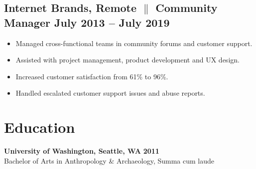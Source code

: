 \documentclass[a4paper,10pt]{article}
\begin{document}
\subsection{Internet Brands, Remote {$\parallel$}{ Community Manager} \hfill
      \textbf{July 2013 – July
            2019}}
\begin{itemize}
      \item Managed cross-functional teams in community forums and customer support.
      \item Assisted with project management, product development and UX design.
      \item Increased customer satisfaction from 61\%
            to
            96\%.
      \item Handled escalated customer support issues and abuse reports.
\end{itemize}

\section{Education}
\textbf{University of Washington, Seattle, WA} \hfill
\textbf{2011}
\\
Bachelor of Arts in Anthropology \& Archaeology, Summa cum laude
\end{document}
